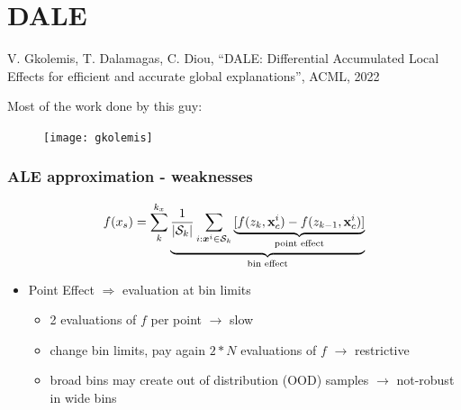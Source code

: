\section{DALE}

\begin{frame}[plain,c]
  \Large{V. Gkolemis, T. Dalamagas, C. Diou, ``DALE: Differential Accumulated
  Local Effects for efficient and accurate global explanations'', ACML, 2022}

  \vspace{1cm}
  Most of the work done by this guy:\\
  \begin{figure}
    \texttt{[image: gkolemis]}
  \end{figure}
\end{frame}

\begin{frame}
  \frametitle{ALE approximation - weaknesses}

  \begin{equation*}
    f(x_s) = \sum_k^{k_x} \underbrace{\frac{1}{|\mathcal{S}_k|} \sum_{i:\boldsymbol{x}^i
        \in \mathcal{S}_k} \underbrace{[f(z_k, \mathbf{x}^i_c) - f(z_{k-1},
          \mathbf{x}^i_c)]}_{\text{point effect}}}_{\text{bin effect}}
  \end{equation*}

  \begin{itemize}
  \item Point Effect \(\Rightarrow\) evaluation \alert{at bin limits}
    \begin{itemize}
    \item 2 evaluations of \(f\) per point \( \rightarrow \) slow
    \item change bin limits, pay again \(2*N\) evaluations of \(f\) \( \rightarrow\) restrictive
    \item broad bins may create out of distribution (OOD) samples \( \rightarrow\) not-robust in wide bins
    \end{itemize}
  \end{itemize}

\end{frame}


